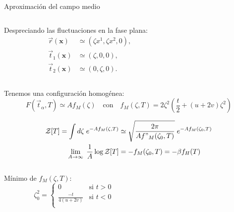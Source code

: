 \documentclass[xcolor=dvipsnames]{beamer}
\begin{document}
\begin{frame}{Aproximación del campo medio}
  \begin{columns}%
    \begin{column}{6.2cm}
      \centering
      Despreciando las fluctuaciones en la fase plana:
     \begin{align*}
       \vec{r}(\mathbf{x})&\simeq(\zeta x^1,\zeta x^2,0),\\
       \vec{t}_1(\mathbf{x})&\simeq(\zeta ,0,0),\\
       \vec{t}_2(\mathbf{x})&\simeq(0,\zeta,0).
     \end{align*}
     
    \end{column}
    \begin{column}{6.25cm}
      \centering
      \begin{figure}[h]
      \resizebox{\columnwidth}{!}{}
      \end{figure} 
    \end{column}
  \end{columns}
Tenemos una configuración homogénea:
\begin{equation*}
  F(\vec{t}_{\alpha},T)\simeq Af_M(\zeta)\quad \text{con}\quad f_M(\zeta,T)=2\zeta^2\left( \frac{t}{2} +(u+2v)\zeta^2\right)
\end{equation*}
\end{frame}
\begin{frame}
\begin{align*}
 \mathcal{Z}[T]=\int d\zeta\;e^{-Af_M(\zeta,T)}&\simeq\sqrt{\frac{2\pi}{Af"_M(\zeta_0,T)}}\;
 e^{-Af_M(\zeta_0,T)}\\
 \lim_{A\rightarrow \infty}\; \frac{1}{A} \log \mathcal{Z}[T]&=-f_M(\zeta_0,T)=-\beta f_H(T)
\end{align*}
\begin{columns}[T]
    \begin{column}{5.8cm}
      \centering
      Mínimo de $f_M(\zeta,T)$:
      $$\zeta^2_0=\begin{cases}
        0& \text{si $t>0$}\\
        \frac{-t}{4(u+2v)}& \text{si $t<0$}\\
      \end{cases}$$
\end{column}
\begin{column}{5.8cm}
      \centering
      \begin{figure}[h]
      \resizebox{\columnwidth}{!}{}
      \end{figure} 
    \end{column}
  \end{columns}
\end{frame}
\end{document}
